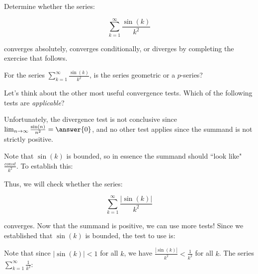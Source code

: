 \documentclass{ximera}
\author{Jim Talamo}
\begin{document}
\begin{exercise}

Determine whether the series:

\[
\sum_{k=1}^{\infty} \frac{\sin(k)}{k^2}
\]

converges absolutely, converges conditionally, or diverges by completing the exercise that follows.

For the series $\sum_{k=1}^{\infty} \frac{\sin(k)}{k^2}$, is the series geometric or a $p$-series?

\begin{multipleChoice}
\end{multipleChoice}

Let's think about the other most useful convergence tests.  Which of the following tests are \emph{applicable}?

\begin{selectAll}
\end{selectAll}

Unfortunately, the divergence test is not conclusive since $\lim_{n \to \infty} \frac{\sin(n)}{n^2} = \answer{0}$, and no other test applies since the summand is not strictly positive.

Note that $\sin(k)$ is bounded, so in essence the summand should ``look like" $\frac{const}{k^2}$.  To establish this:

\begin{multipleChoice}
\end{multipleChoice} 

Thus, we will check whether the series:

\[
\sum_{k=1}^{\infty} \frac{|\sin(k)|}{k^2}
\]

converges.  Now that the summand is positive, we can use more tests!  Since we established that $\sin(k)$ is bounded, the test to use is:
\begin{multipleChoice}
\end{multipleChoice}

Note that since $|\sin(k)|<1$ for all $k$, we have $\frac{|\sin(k)|}{k^2}<\frac{1}{k^2}$ for all $k$.  The series $\sum_{k=1}^{\infty} \frac{1}{k^2}$:


\end{exercise}
\end{document}
